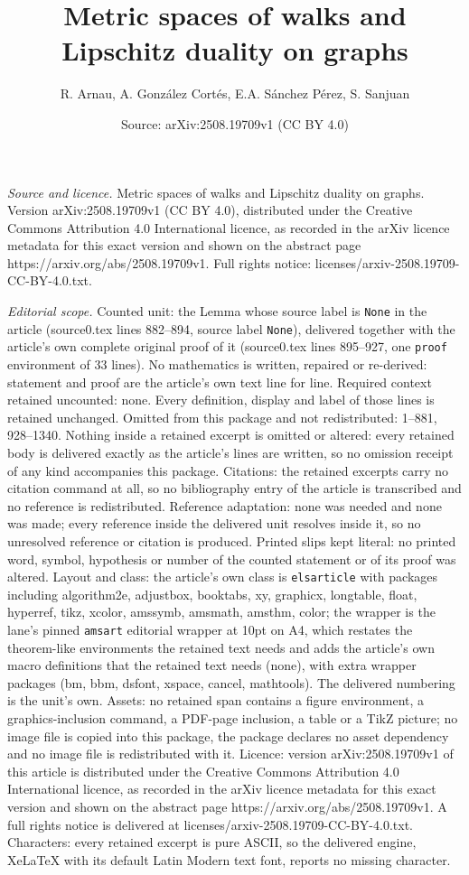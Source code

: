 \documentclass[10pt,a4paper]{amsart}
\title[Metric spaces of walks and Lipschitz duality on graphs]{Metric spaces of walks and Lipschitz duality on graphs}
\author{R. Arnau, A. Gonz\'alez Cort\'es, E.A. S\'anchez P\'erez, S. Sanjuan}
\date{Source: arXiv:2508.19709v1 (CC BY 4.0)}
\begin{document}
\maketitle

\noindent\emph{Source and licence.} Metric spaces of walks and Lipschitz duality on graphs. Version arXiv:2508.19709v1 (CC BY 4.0), distributed under the Creative Commons Attribution 4.0 International licence, as recorded in the arXiv licence metadata for this exact version and shown on the abstract page https://arxiv.org/abs/2508.19709v1. Full rights notice: licenses/arxiv-2508.19709-CC-BY-4.0.txt.\par\smallskip

\noindent\textit{Editorial scope.} Counted unit: the Lemma whose source label is \texttt{None} in the article (source0.tex lines 882--894, source label \texttt{None}), delivered together with the article's own complete original proof of it (source0.tex lines 895--927, one \texttt{proof} environment of 33 lines). No mathematics is written, repaired or re-derived: statement and proof are the article's own text line for line. Required context retained uncounted: none. Every definition, display and label of those lines is retained unchanged. Omitted from this package and not redistributed: 1--881, 928--1340. Nothing inside a retained excerpt is omitted or altered: every retained body is delivered exactly as the article's lines are written, so no omission receipt of any kind accompanies this package. Citations: the retained excerpts carry no citation command at all, so no bibliography entry of the article is transcribed and no reference is redistributed. Reference adaptation: none was needed and none was made; every reference inside the delivered unit resolves inside it, so no unresolved reference or citation is produced. Printed slips kept literal: no printed word, symbol, hypothesis or number of the counted statement or of its proof was altered. Layout and class: the article's own class is \texttt{elsarticle} with packages including algorithm2e, adjustbox, booktabs, xy, graphicx, longtable, float, hyperref, tikz, xcolor, amssymb, amsmath, amsthm, color; the wrapper is the lane's pinned \texttt{amsart} editorial wrapper at 10pt on A4, which restates the theorem-like environments the retained text needs and adds the article's own macro definitions that the retained text needs (none), with extra wrapper packages (bm, bbm, dsfont, xspace, cancel, mathtools). The delivered numbering is the unit's own. Assets: no retained span contains a figure environment, a graphics-inclusion command, a PDF-page inclusion, a table or a TikZ picture; no image file is copied into this package, the package declares no asset dependency and no image file is redistributed with it. Licence: version arXiv:2508.19709v1 of this article is distributed under the Creative Commons Attribution 4.0 International licence, as recorded in the arXiv licence metadata for this exact version and shown on the abstract page https://arxiv.org/abs/2508.19709v1. A full rights notice is delivered at licenses/arxiv-2508.19709-CC-BY-4.0.txt. Characters: every retained excerpt is pure ASCII, so the delivered engine, XeLaTeX with its default Latin Modern text font, reports no missing character.
\end{document}
